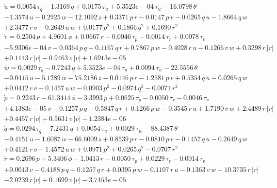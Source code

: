 \documentclass[12pt,a4]{article}
\begin{document}
\begin{multline}
	\dot{u} = 0.0054\,\tau _{q}-1.3169\,q+0.0175\,\tau _{u}+5.3523e-04\,\tau _{w}-16.0798\,\theta \\-1.3574\,u-0.2925\,w-12.1092\,z+0.3371\,p\,r-0.0147\,p\,v-0.0265\,q\,u-1.8664\,q\,w\\+2.3477\,r\,v+0.2649\,u\,w+0.0177\,p^2+0.1866\,q^2+0.1690\,r^2
\end{multline}
\begin{multline}
	\dot{v} = 0.2504\,p+4.9601\,\phi +0.0667\,r-0.0046\,\tau _{p}-0.0014\,\tau _{r}+0.0078\,\tau _{v}\\-5.9306e-04\,v-0.0364\,p\,q+0.1167\,q\,r+0.7867\,p\,w-0.4028\,r\,u-0.1266\,v\,w+0.3298\,r\,\left|r\right|\\+0.1143\,r\,\left|v\right|-0.9463\,v\,\left|v\right|+1.6913e-05
\end{multline}
\begin{multline}
	\dot{w} = 0.0029\,\tau _{q}-0.7243\,q+5.3523e-04\,\tau _{u}+0.0094\,\tau _{w}-22.5556\,\theta \\-0.0415\,u-5.1289\,w-75.2186\,z-0.0146\,p\,r-1.2581\,p\,v+0.5354\,q\,u-0.0265\,q\,w\\+0.0412\,r\,v+0.1457\,u\,w-0.0903\,p^2-0.0974\,q^2-0.0071\,r^2
\end{multline}
\begin{multline}
	\dot{p} = 0.2243\,r-67.3414\,\phi -3.3993\,p+0.0625\,\tau _{p}-0.0050\,\tau _{r}-0.0046\,\tau _{v}\\+4.1383e-05\,v-0.1257\,p\,q-0.5847\,q\,r+0.1266\,p\,w-0.3545\,r\,u+1.7190\,v\,w+2.4489\,r\,\left|r\right|\\+0.4457\,r\,\left|v\right|+0.5631\,v\,\left|v\right|-1.2384e-06
\end{multline}
\begin{multline}
	\dot{q} = 0.0294\,\tau _{q}-7.2431\,q+0.0054\,\tau _{u}+0.0029\,\tau _{w}-88.4387\,\theta \\-0.4151\,u-1.6087\,w-66.6009\,z+0.8539\,p\,r-0.0810\,p\,v-0.1457\,q\,u-0.2649\,q\,w\\+0.4121\,r\,v+1.4572\,u\,w+0.0971\,p^2+0.0265\,q^2-0.0707\,r^2
\end{multline}
\begin{multline}
	\dot{r} = 0.2696\,p+5.3406\,\phi -1.0413\,r-0.0050\,\tau _{p}+0.0229\,\tau _{r}-0.0014\,\tau _{v}\\+0.0013\,v-0.4188\,p\,q+0.1257\,q\,r+0.0395\,p\,w-0.1107\,r\,u-0.1363\,v\,w-10.3735\,r\,\left|r\right|\\-2.0239\,r\,\left|v\right|+0.1699\,v\,\left|v\right|-3.7453e-05
\end{multline}
\end{document}
